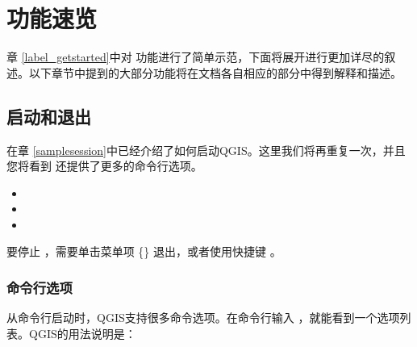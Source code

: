 
\chapter{功能速览}\label{feature_glance}


章 \ref{label_getstarted}中对 \qg 功能进行了简单示范，下面将展开进行更加详尽的叙述。以下章节中提到的大部分功能将在文档各自相应的部分中得到解释和描述。

\section{启动和退出 \qg}\label{label_startinqgis}

在章 \ref{samplesession}中已经介绍了如何启动QGIS。这里我们将再重复一次，并且您将看到 \qg 还提供了更多的命令行选项。

\begin{itemize}
\item {}
\item {}
\item {}
\end{itemize}

要停止 \qg，需要单击菜单项 \{\nix{}\} \arrow 退出，或者使用快捷键 。

\subsection{命令行选项}
\label{label_commandline}

\nix 从命令行启动时，QGIS支持很多命令选项。在命令行输入 ，就能看到一个选项列表。QGIS的用法说明是：

